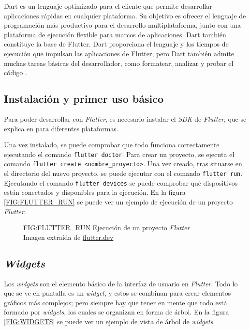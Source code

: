 Dart es un lenguaje optimizado para el cliente que permite desarrollar aplicaciones rápidas en cualquier 
plataforma. Su objetivo es ofrecer el lenguaje de programación más productivo para el desarrollo 
multiplataforma, junto con una plataforma de ejecución flexible para marcos de aplicaciones. 
Dart también constituye la base de Flutter. Dart proporciona el lenguaje y los tiempos de ejecución 
que impulsan las aplicaciones de Flutter, pero Dart también admite muchas tareas básicas del desarrollador, 
como formatear, analizar y probar el código \cite{dart_overview}.

\subsection{Instalación y primer uso básico\label{SEC:INSTALACION}}

Para poder desarrollar con \textit{Flutter}, es necesario instalar el \textit{SDK} de 
\textit{Flutter}, que se explica en \cite{flutter_install} para diferentes plataformas.

Una vez instalado, se puede comprobar que todo funciona correctamente ejecutando el comando 
\texttt{flutter doctor}. Para crear un proyecto, se ejecuta el comando \texttt{flutter create <nombre\_proyecto>}.
Una vez creado, tras situarse en el directorio del nuevo proyecto, se puede ejecutar
con el comando \texttt{flutter run}. Ejecutando el comando \texttt{flutter devices} se puede
comprobar qué dispositivos están conectados y disponibles para la ejecución. En la figura \ref{FIG:FLUTTER_RUN} 
se puede ver un ejemplo de ejecución de un proyecto \textit{Flutter}.

\begin{figure}[Ejecución de un proyecto \textit{Flutter}]{FIG:FLUTTER_RUN}
  {Ejecución de un proyecto \textit{Flutter} \\
   \footnotesize{
    Imagen extraída de \href{
      https://docs.flutter.dev/get-started/test-drive?tab=terminal
    }{flutter.dev}
    }
  }
\end{figure}


\subsection{\textit{Widgets}\label{SEC:WIDGETS}}

Los \textit{widgets} son el elemento básico de la interfaz de usuario en \textit{Flutter}. Todo lo que se ve
en pantalla es un \textit{widget}, y estos se combinan para crear elementos gráficos más complejos; pero 
siempre hay que tener en mente que todo está formado por \textit{widgets}, los cuales se organizan en forma de
árbol. En la figura \ref{FIG:WIDGETS} se puede ver un ejemplo de vista de árbol de \textit{widgets}.

